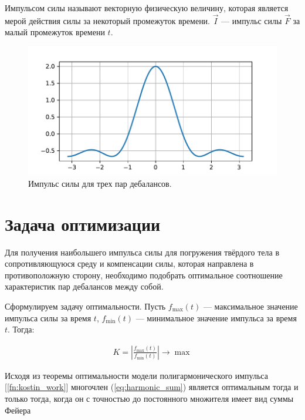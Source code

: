 \begin{definition}
    Импульсом силы называют векторную физическую величину, которая является мерой действия силы за некоторый промежуток времени. $\vec{I}$ --- импульс силы $\vec{F}$ за малый промежуток времени $t$.
\end{definition}

\begin{figure}[h]
    \centering
    \includegraphics[width=1\linewidth]{grap/impulse.pdf}
    \caption{Импульс силы для трех пар дебалансов.}
    \label{grap:impulse}
\end{figure}


\clearpage
\section{Задача оптимизации}

Для получения наибольшего импульса силы для погружения твёрдого тела в сопротивляющуюся среду и компенсации силы, которая направлена в противоположную сторону, необходимо подобрать оптимальное соотношение характеристик пар дебалансов между собой.

Сформулируем задачу оптимальности. Пусть $f_{\max}(t)$ --- максимальное значение импульса силы за время $t$, $f_{\min}(t)$ --- минимальное значение импульса за время $t$. Тогда:

\begin{equation}\label{eq:optim}
    \begin{aligned}
        K = \left| \frac{f_{\max}(t)}{f_{\min}(t)} \right| \rightarrow \max
    \end{aligned}
\end{equation}

Исходя из теоремы оптимальности модели полигармонического импульса [\ref{fn:kostin_work}] многочлен (\ref{eq:harmonic_sum}) является оптимальным тогда и только тогда, когда он с точностью до постоянного множителя имеет вид суммы Фейера

